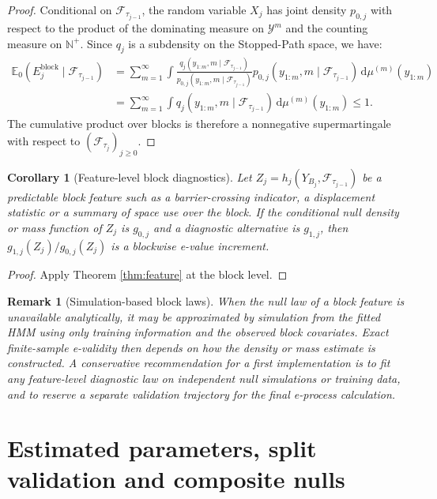 \documentclass[pdflatex,sn-basic]{sn-jnl}
\theoremstyle{thmstyleone}
\newtheorem{corollary}[theorem]{Corollary}
\theoremstyle{thmstyletwo}
\newtheorem{remark}{Remark}
\theoremstyle{thmstylethree}
\newcommand{\E}{\mathbb E}
\newcommand{\1}{\mathbf 1}
\newcommand{\calF}{\mathcal F}
\newcommand{\calY}{\mathcal Y}
\newcommand{\dd}{\,\mathrm d}
\begin{document}
\begin{proof}
Conditional on $\calF_{\tau_{j-1}}$, the random variable $X_j$ has joint density $p_{0,j}$ with respect to the product of the dominating measure on $\calY^m$ and the counting measure on $\mathbb{N}^+$. Since $q_j$ is a subdensity on the Stopped-Path space, we have:
\begin{align}
 \E_0(E_j^{\mathrm{block}}\mid\calF_{\tau_{j-1}})
 &= \sum_{m=1}^\infty \int \frac{q_j(y_{1:m}, m \mid \calF_{\tau_{j-1}})}{p_{0,j}(y_{1:m}, m \mid \calF_{\tau_{j-1}})} p_{0,j}(y_{1:m}, m \mid \calF_{\tau_{j-1}}) \dd\mu^{(m)}(y_{1:m}) \\
 &= \sum_{m=1}^\infty \int q_j(y_{1:m}, m \mid \calF_{\tau_{j-1}}) \dd\mu^{(m)}(y_{1:m}) \leq 1.
\end{align}
The cumulative product over blocks is therefore a nonnegative supermartingale with respect to $(\calF_{\tau_j})_{j\geq 0}$.
\end{proof}

\begin{corollary}[Feature-level block diagnostics]
\label{cor:block_feature}
Let $Z_j=h_j(Y_{B_j},\calF_{\tau_{j-1}})$ be a predictable block feature such as a barrier-crossing indicator, a displacement statistic or a summary of space use over the block. If the conditional null density or mass function of $Z_j$ is $g_{0,j}$ and a diagnostic alternative is $g_{1,j}$, then $g_{1,j}(Z_j)/g_{0,j}(Z_j)$ is a blockwise e-value increment.
\end{corollary}

\begin{proof}
Apply Theorem \ref{thm:feature} at the block level.
\end{proof}

\begin{remark}[Simulation-based block laws]
When the null law of a block feature is unavailable analytically, it may be approximated by simulation from the fitted HMM using only training information and the observed block covariates. Exact finite-sample e-validity then depends on how the density or mass estimate is constructed. A conservative recommendation for a first implementation is to fit any feature-level diagnostic law on independent null simulations or training data, and to reserve a separate validation trajectory for the final e-process calculation.
\end{remark}

\section{Estimated parameters, split validation and composite nulls}
\label{sec:estimated}
\end{document}
